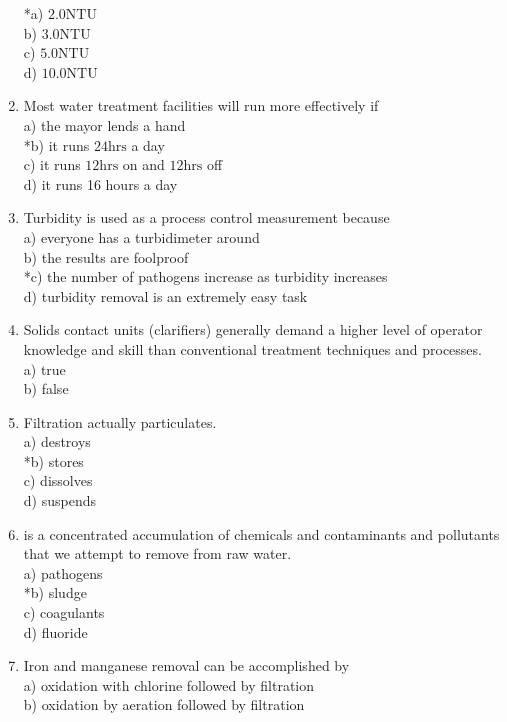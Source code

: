 \begin{enumerate}
*a) $2.0 \mathrm{NTU}$\\
b) $3.0 \mathrm{NTU}$\\
c) $5.0 \mathrm{NTU}$\\
d) $10.0 \mathrm{NTU}$\\
\item Most water treatment facilities will run more effectively if\\
a) the mayor lends a hand\\
*b) it runs $24 \mathrm{hrs}$ a day\\
c) it runs $12 \mathrm{hrs}$ on and $12 \mathrm{hrs}$ off\\
d) it runs 16 hours a day\\
\item Turbidity is used as a process control measurement because\\
a) everyone has a turbidimeter around\\
b) the results are foolproof\\
*c) the number of pathogens increase as turbidity increases\\
d) turbidity removal is an extremely easy task\\
\item Solids contact units (clarifiers) generally demand a higher level of operator knowledge and skill than conventional treatment techniques and processes.\\
a) true\\
b) false\\
\item Filtration actually particulates.\\
a) destroys\\
*b) stores\\
c) dissolves\\
d) suspends\\
\item is a concentrated accumulation of chemicals and contaminants and pollutants that we attempt to remove from raw water.\\
a) pathogens\\
*b) sludge\\
c) coagulants\\
d) fluoride\\
\item Iron and manganese removal can be accomplished by\\
a) oxidation with chlorine followed by filtration\\
b) oxidation by aeration followed by filtration\\

\end{enumerate}
